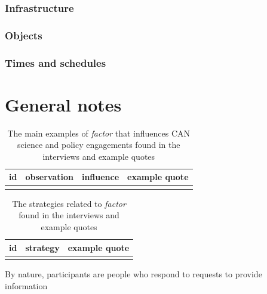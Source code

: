 \subsubsection{Infrastructure}\label{sec:resinfrastructure}
\subsubsection{Objects}\label{sec:resobjects}
\subsubsection{Times and schedules}\label{sec:restimes}

\section{General notes}

\begin{table}[!ht]
\footnotesize
\caption{The main examples of \emph{factor} that influences CAN science and policy  engagements found in the interviews and example quotes}\label{tab:res****}
\begin{tabular}{L{.06\linewidth}L{.3\linewidth}L{.12\linewidth}L{.52\linewidth}} \hline
\textbf{id} & \textbf{observation} & \textbf{influence} & \textbf{example quote} \\ \hline \hline 
 &  &  &  \\[5mm] \hline
\end{tabular}
\end{table}

\begin{table}[!ht]
\footnotesize
\caption{The strategies related to \emph{factor} found in the interviews and example quotes}\label{tab:res****strat}
\begin{tabular}{L{.06\linewidth}L{.3\linewidth}L{.64\linewidth}} \hline
\textbf{id} & \textbf{strategy} & \textbf{example quote} \\ \hline \hline
 &  & \\[5mm] \hline
 \end{tabular}
\end{table}


By nature, participants are people who respond to requests to provide information


%
